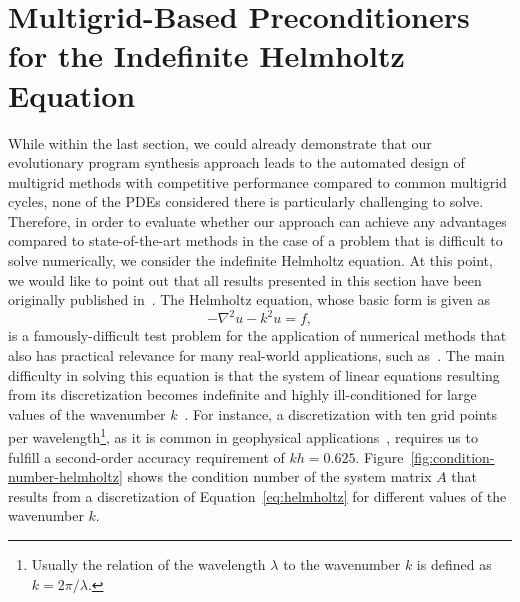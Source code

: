 \section[Multigrid-Based Preconditioners for the Indefinite \\ Helmholtz Equation]{Multigrid-Based Preconditioners for the Indefinite Helmholtz Equation}
While within the last section, we could already demonstrate that our evolutionary program synthesis approach leads to the automated design of multigrid methods with competitive performance compared to common multigrid cycles, none of the PDEs considered there is particularly challenging to solve.   
Therefore, in order to evaluate whether our approach can achieve any advantages compared to state-of-the-art methods in the case of a problem that is difficult to solve numerically, we consider the indefinite Helmholtz equation.
At this point, we would like to point out that all results presented in this section have been originally published in~\cite{schmitt2022evolving}.
The Helmholtz equation, whose basic form is given as 
\begin{equation}
	-\nabla ^{2}u - k^{2}u = f,
	\label{eq:helmholtz}
\end{equation} 
is a famously-difficult test problem for the application of numerical methods that also has practical relevance for many real-world applications, such as~\cite{versteeg1994marmousi,martin2006marmousi2,billette20052004,gray1995migration}.
The main difficulty in solving this equation is that the system of linear equations resulting from its discretization becomes indefinite and highly ill-conditioned for large values of the wavenumber $k$~\cite{ernst2012difficult}.
For instance, a discretization with ten grid points per wavelength\footnote{Usually the relation of the wavelength $\lambda$ to the wavenumber $k$ is defined as $k = 2 \pi/\lambda$.}, as it is common in geophysical applications~\cite{erlangga2006multigrid}, requires us to fulfill a second-order accuracy requirement of $kh = 0.625$.
Figure~\ref{fig:condition-number-helmholtz} shows the condition number of the system matrix $A$ that results from a discretization of Equation~\eqref{eq:helmholtz} for different values of the wavenumber $k$.
